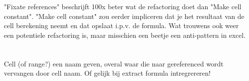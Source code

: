 "Fixate references" beschrijft 100x beter wat de refactoring doet dan "Make cell constant". "Make cell constant" zou eerder impliceren dat je het resultaat van de cell berekening neemt en dat opslaat i.p.v. de formula. Wat trouwens ook weer een potentiele refactoring is, maar misschien een beetje een anti-pattern in excel.

\section{}


Cell (of range?) een naam geven, overal waar die naar gereferenced wordt vervangen door cell naam.
Of gelijk bij extract formula intregrereren!